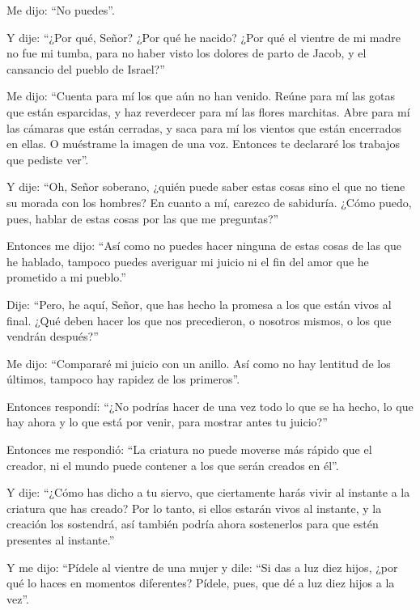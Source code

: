  Me dijo: ``No puedes''.

Y dije: ``¿Por qué, Señor? ¿Por qué he nacido? ¿Por qué el vientre de mi
madre no fue mi tumba, para no haber visto los dolores de parto de
Jacob, y el cansancio del pueblo de Israel?''

 Me dijo: ``Cuenta para mí los que aún no han venido.
Reúne para mí las gotas que están esparcidas, y haz reverdecer para mí
las flores marchitas.  Abre para mí las cámaras que están
cerradas, y saca para mí los vientos que están encerrados en ellas. O
muéstrame la imagen de una voz. Entonces te declararé los trabajos que
pediste ver''.

 Y dije: ``Oh, Señor soberano, ¿quién puede saber estas
cosas sino el que no tiene su morada con los hombres?  En
cuanto a mí, carezco de sabiduría. ¿Cómo puedo, pues, hablar de estas
cosas por las que me preguntas?''

 Entonces me dijo: ``Así como no puedes hacer ninguna de
estas cosas de las que he hablado, tampoco puedes averiguar mi juicio ni
el fin del amor que he prometido a mi pueblo.''

 Dije: ``Pero, he aquí, Señor, que has hecho la promesa a
los que están vivos al final. ¿Qué deben hacer los que nos precedieron,
o nosotros mismos, o los que vendrán después?''

 Me dijo: ``Compararé mi juicio con un anillo. Así como
no hay lentitud de los últimos, tampoco hay rapidez de los primeros''.

 Entonces respondí: ``¿No podrías hacer de una vez todo
lo que se ha hecho, lo que hay ahora y lo que está por venir, para
mostrar antes tu juicio?''

 Entonces me respondió: ``La criatura no puede moverse
más rápido que el creador, ni el mundo puede contener a los que serán
creados en él''.

 Y dije: ``¿Cómo has dicho a tu siervo, que ciertamente
harás vivir al instante a la criatura que has creado? Por lo tanto, si
ellos estarán vivos al instante, y la creación los sostendrá, así
también podría ahora sostenerlos para que estén presentes al instante.''

 Y me dijo: ``Pídele al vientre de una mujer y dile: ``Si
das a luz diez hijos, ¿por qué lo haces en momentos diferentes? Pídele,
pues, que dé a luz diez hijos a la vez''.

